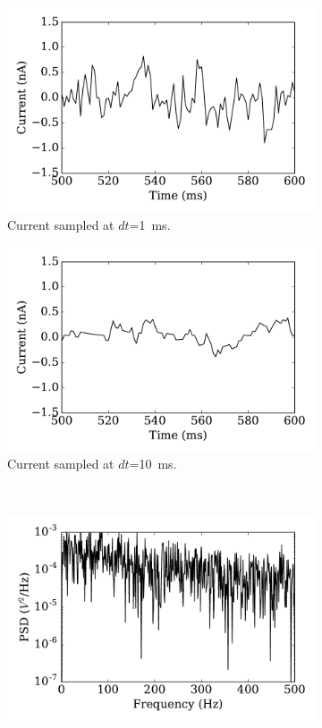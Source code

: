 \documentclass[runningheads,a4paper]{llncs}
\begin{document}
\begin{figure}[tbp!]
	\centering
	  \par
	\begin{subfigure}[t]{0.43\textwidth}
		\includegraphics[width=\textwidth]{curr_tau1.pdf}
		\caption{Current sampled at $dt$=1~ms.}
	\end{subfigure}
	\begin{subfigure}[t]{0.43\textwidth}
		\includegraphics[width=\textwidth]{curr_tau10.pdf}
		\caption{Current sampled at $dt$=10~ms.}
	\end{subfigure}\\
	\begin{subfigure}[t]{0.43\textwidth}
		\includegraphics[width=\textwidth]{psd_tau1.pdf}

\end{subfigure}
\end{figure}
\end{document}
